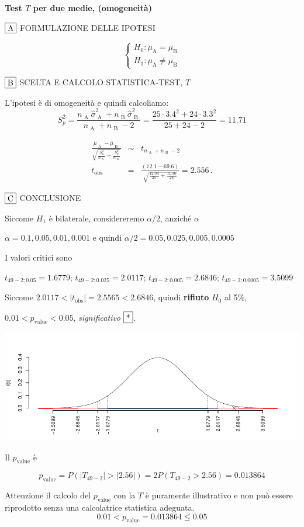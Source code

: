 \documentclass[
  11pt,
]{book}
\theoremstyle{mytheoremstyle}
\theoremstyle{mydefstyle}
\newenvironment{sol}
  {
  \begin{tcolorbox}[enhanced,breakable,arc=0.1mm,boxrule=1pt,colback=white,colframe=iblue,
  title=\bf \fontfamily{lmss}\selectfont \hspace{.5 cm} Soluzione,drop fuzzy shadow]

}{
\end{tcolorbox}
  }
\begin{document}
\begin{sol}
\textbf{Test \(T\) per due medie, (omogeneità)}

\(\fbox{A}\) FORMULAZIONE DELLE IPOTESI

\[\begin{cases}
   H_0: \mu_\text{A} = \mu_\text{B} \\
   H_1: \mu_\text{A} \neq \mu_\text{B} 
   \end{cases}\]

\(\fbox{B}\) SCELTA E CALCOLO STATISTICA-TEST, \(T\)

L'ipotesi è di omogeneità e quindi calcoliamo:\[
   S_p^2=\frac{n_\text{ A }\hat\sigma^2_\text{ A }+n_\text{ B }\hat\sigma^2_\text{ B }}{n_\text{ A }+n_\text{ B }-2} =
   \frac{ 25 \cdot 3.4 ^2+ 24 \cdot 3.3 ^2}{ 25 + 24 -2}= 11.71 
  \]

\begin{eqnarray*}
  \frac{\hat\mu_\text{ A } - \hat\mu_\text{ B }}
  {\sqrt{\frac {S^2_p}{n_\text{ A }}+\frac {S^2_p}{n_\text{ B }}}}&\sim&t_{n_\text{ A }+n_\text{ B }-2}\\
  t_{\text{obs}}
  &=& \frac{ ( 72.1 -  69.6 )} {\sqrt{\frac{ 12.04 }{ 25 }+\frac{ 11.36 }{ 24 }}}
  =   2.556 \, .
  \end{eqnarray*}

\(\fbox{C}\) CONCLUSIONE

Siccome \(H_1\) è bilaterale, considereremo \(\alpha/2\),
anziché \(\alpha\)

\(\alpha=0.1, 0.05, 0.01, 0.001\) e quindi \(\alpha/2=0.05, 0.025, 0.005, 0.0005\)

I valori critici sono

\(t_{49-2;0.05}=1.6779\); \(t_{49-2;0.025}=2.0117\); \(t_{49-2;0.005}=2.6846\); \(t_{49-2;0.0005}=3.5099\)

Siccome \(2.0117<|t_\text{obs}|=2.5565<2.6846\), quindi \textbf{rifiuto} \(H_0\) al 5\%,

\(0.01<p_\text{value}<0.05\), \emph{significativo} \(\fbox{*}\).

\begin{center}\includegraphics{Esami_passati_con_soluzioni_files/figure-latex/2023-71,-1} \end{center}

Il \(p_{\text{value}}\) è

\[ p_{\text{value}} = P(|T_{49-2}|>|2.56|)=2P(T_{49-2}>2.56)=0.013864 \]

Attenzione il calcolo del \(p_\text{value}\) con la \(T\) è puramente illustrativo e non può essere riprodotto senza una calcolatrice statistica adeguata.\[
 0.01 < p_\text{value}= 0.013864 \leq 0.05 
\]

\end{sol}
\end{document}
